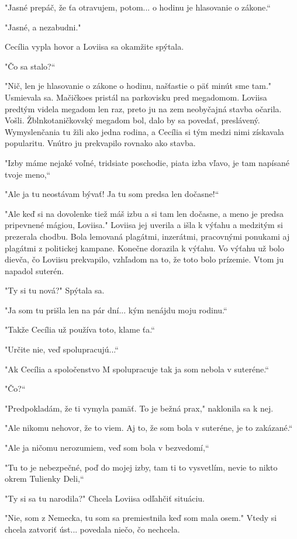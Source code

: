 \documentclass{book}
\begin{document}
"Jasné prepáč, že ťa otravujem, potom... o hodinu je hlasovanie o zákone.“

"Jasné, a nezabudni."$ $ 

Cecília vypla hovor a Loviisa sa okamžite spýtala.

"Čo sa stalo?“

"Nič, len je hlasovanie o zákone o hodinu, našťastie o päť minút sme tam."$ $ Usmievala sa. Mačičkoes pristál na parkovisku pred megadomom. Loviisa predtým videla megadom len raz, preto ju na zem neobyčajná stavba očarila. Vošli. Žblnkotaničkovský megadom bol, dalo by sa povedať, preslávený. Wymyslenčania tu žili ako jedna rodina, a Cecília si tým medzi nimi získavala popularitu. Vnútro ju prekvapilo rovnako ako stavba.

"$ $Izby máme nejaké voľné, tridsiate poschodie, piata izba vľavo, je tam napísané tvoje meno,“

"$ $Ale ja tu neostávam bývať! Ja tu som predsa len dočasne!“

"$ $Ale keď si na dovolenke tiež máš izbu a si tam len dočasne, a meno je predsa pripevnené mágiou, Loviisa."$ $ Loviisa jej uverila a išla k výťahu a medzitým si prezerala chodbu. Bola lemovaná plagátmi, inzerátmi, pracovnými ponukami aj plagátmi z politickej kampane. Konečne dorazila k výťahu. Vo výťahu už bolo dievča, čo Loviisu prekvapilo, vzhľadom na to, že toto bolo prízemie. Vtom ju napadol suterén.

"Ty si tu nová?"$ $ Spýtala sa.

"Ja som tu prišla len na pár dní... kým nenájdu moju rodinu.“

"Takže Cecília už používa toto, klame ťa.“

"$ $Určite nie, veď spolupracujú...“

"$ $Ak Cecília a spoločenstvo M spolupracuje tak ja som nebola v suteréne.“

"Čo?“

"Predpokladám, že ti vymyla pamäť. To je bežná prax,"$ $ naklonila sa k nej.

"$ $Ale nikomu nehovor, že to viem. Aj to, že som bola v suteréne, je to zakázané.“

"$ $Ale ja ničomu nerozumiem, veď som bola v bezvedomí,“

"Tu to je nebezpečné, poď do mojej izby, tam ti to vysvetlím, nevie to nikto okrem Tulienky Deli,“

"Ty si sa tu narodila?"$ $ Chcela Loviisa odľahčiť situáciu.

"Nie, som z Nemecka, tu som sa premiestnila keď som mala osem."$ $ Vtedy si chcela zatvoriť úst... povedala niečo, čo nechcela.
\end{document}
